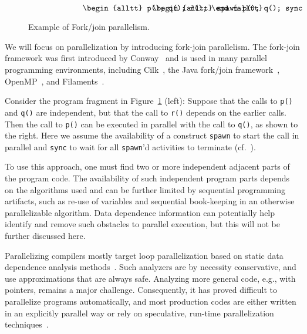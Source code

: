 \documentclass{acm_proc_article-sp}
\begin{document}
\begin{figure}
\small
\hrulefill
\[
\begin{minipage}[t]{3cm}
\begin{alltt}
   p();
   q();
   r();
\end{alltt}
\end{minipage}
\begin{minipage}[t]{3cm}
\begin{alltt}
   spawn p();
   q();
   sync;
   r();
\end{alltt}
\end{minipage} 
\]
\hrulefill
\caption{Example of Fork/join parallelism.}
\label{fforkjoin}
\end{figure}

We will focus on parallelization by introducing
fork-join parallelism. The fork-join framework was first introduced
by Conway~\cite{Conway63} and is used in many parallel
programming environments,
including Cilk~\cite{BJKLR96}, the Java fork/join
framework~\cite{Lea00}, OpenMP~\cite{DM98}, and Filaments~\cite{LF00}.

Consider the program fragment in
Figure~\ref{fforkjoin} (left):
Suppose that the calls to {\tt p()} and {\tt q()} are independent,
but that the call to {\tt r()} depends on the earlier calls. Then
the call to {\tt p()} can be
executed in parallel with
the call to {\tt q()}, as shown to the right.
Here we assume the availability of a construct {\tt spawn} to start
the call in parallel and {\tt sync} to wait for all {\tt spawn}'d
activities to terminate (cf.~\cite{BJKLR96}).

To use this approach, one must find two or more
independent adjacent parts of the program code.
The availability of such independent program parts depends on
the algorithms used and can be further
limited by sequential programming artifacts, such as re-use of
variables and sequential book-keeping in an otherwise parallelizable
algorithm.  Data dependence information can potentially help
identify and remove such obstacles to parallel execution, but this
will not be further discussed here.

Parallelizing compilers mostly target loop parallelization based on
static data dependence analysis methods~\cite{KA02}.  Such analyzers are
by necessity conservative, and use
approximations that are always safe.  
Analyzing more general code, e.g., with pointers, remains a major
challenge.  Consequently, it has proved difficult to
parallelize programs automatically, and most production codes are either
written in an explicitly parallel way or rely on speculative, run-time
parallelization techniques~\cite{PO03,CL03}.
\end{document}
